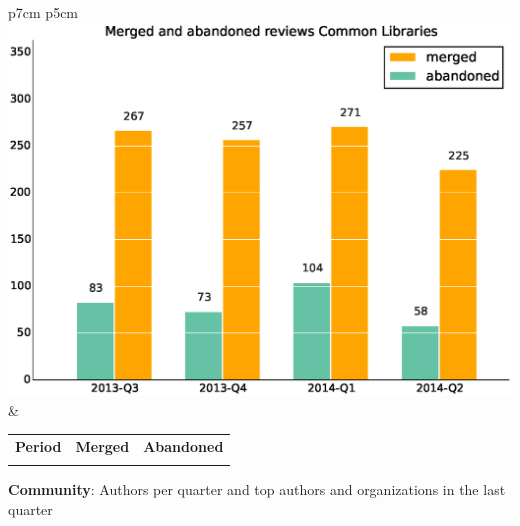 \documentclass[a4wide,11pt]{report}
\begin{document}
\begin{tabular}{p{7cm} p{5cm}}
    \vspace{0pt} 
    \includegraphics[scale=.35]{figs/submitted_reviewsCommonLibraries.eps}
    & 
    \vspace{0pt}
    \begin{tabular}{l|r|r|}%
    \bfseries Period & \bfseries Merged & \bfseries Abandoned %
    \csvreader[head to column names]{data/submitted_reviewsCommonLibraries.csv}{}%
    {\\ & \merged & \abandoned}
    \end{tabular}
\end{tabular}


\textbf{Community}: Authors per quarter and top authors and organizations in the last quarter
\end{document}
